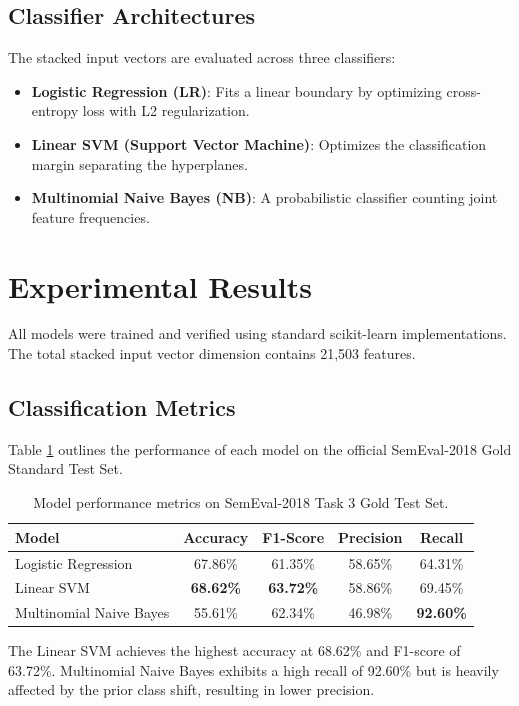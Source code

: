 \documentclass[11pt,a4paper]{article}
\begin{document}
\subsection{Classifier Architectures}
The stacked input vectors are evaluated across three classifiers:
\begin{itemize}
    \item \textbf{Logistic Regression (LR)}: Fits a linear boundary by optimizing cross-entropy loss with L2 regularization.
    \item \textbf{Linear SVM (Support Vector Machine)}: Optimizes the classification margin separating the hyperplanes.
    \item \textbf{Multinomial Naive Bayes (NB)}: A probabilistic classifier counting joint feature frequencies.
\end{itemize}

\section{Experimental Results}
All models were trained and verified using standard scikit-learn implementations. The total stacked input vector dimension contains 21,503 features.

\subsection{Classification Metrics}
Table \ref{tab:results} outlines the performance of each model on the official SemEval-2018 Gold Standard Test Set. 

\begin{table}[h]
\centering
\begin{tabular}{lcccc}
\toprule
\textbf{Model} & \textbf{Accuracy} & \textbf{F1-Score} & \textbf{Precision} & \textbf{Recall} \\
\midrule
Logistic Regression & 67.86\% & 61.35\% & 58.65\% & 64.31\% \\
Linear SVM & \textbf{68.62\%} & \textbf{63.72\%} & 58.86\% & 69.45\% \\
Multinomial Naive Bayes & 55.61\% & 62.34\% & 46.98\% & \textbf{92.60\%} \\
\bottomrule
\end{tabular}
\caption{Model performance metrics on SemEval-2018 Task 3 Gold Test Set.}
\label{tab:results}
\end{table}

The Linear SVM achieves the highest accuracy at 68.62\% and F1-score of 63.72\%. Multinomial Naive Bayes exhibits a high recall of 92.60\% but is heavily affected by the prior class shift, resulting in lower precision.
\end{document}
